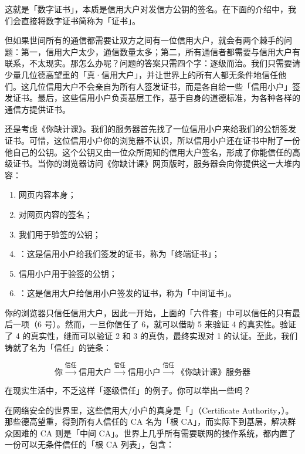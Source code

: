 这就是「数字证书」，本质是信用大户对发信方公钥的签名。在下面的介绍中，我们会直接将数字证书简称为「证书」。

但如果世间所有的通信都需要让双方之间有一位信用大户，就会有两个棘手的问题：第一，信用大户太少，通信数量太多；第二，所有通信者都需要与信用大户有联系，不太现实。那怎么办呢？问题的答案只需四个字：逐级而治。我们只需要请少量几位德高望重的「真·信用大户」，并让世界上的所有人都无条件地信任他们。这几位信用大户不会亲自为所有人签发证书，而是各自给一些「信用小户」签发证书。最后，这些信用小户负责基层工作，基于自身的道德标准，为各种各样的通信方提供证书。

还是考虑《你缺计课》。我们的服务器首先找了一位信用小户来给我们的公钥签发证书。可惜，这位信用小户你的浏览器不认识，所以信用小户还在证书中附了一份他自己的公钥。这个公钥又由一位众所周知的信用大户签名，形成了你能信任的高级证书。当你的浏览器访问《你缺计课》网页版时，服务器会向你提供这一大堆内容：

\begin{enumerate}
  \item 网页内容本身；
  \item 对网页内容的签名；
  \item 我们用于验签的公钥；
  \item {}：这是信用小户给我们签发的证书，称为「终端证书」；
  \item 信用小户用于验签的公钥；
  \item {}：这是信用大户给信用小户签发的证书，称为「中间证书」。
\end{enumerate}

你的浏览器只信任信用大户，因此一开始，上面的「六件套」中可以信任的只有最后一项（6 号）。然而，一旦你信任了 6，就可以借助 5 来验证 4 的真实性。验证了 4 的真实性，继而可以验证 2 和 3 的真伪，最终实现对 1 的认证。至此，我们铸就了名为「信任」的链条：

\[ \text{你}\xrightarrow{\text{信任}}\text{信用大户}\xrightarrow{\text{信任}}\text{信用小户}\xrightarrow{\text{信任}}\text{《你缺计课》服务器} \]

\begin{note}
  在现实生活中，不乏这样「逐级信任」的例子。你可以举出一些吗？
\end{note}

在网络安全的世界里，这些信用大/小户的真身是「」（Certificate Authority，）。那些德高望重，得到所有人信任的 CA 名为「根 CA」，而实际下到基层，解决群众困难的 CA 则是「中间 CA」。世界上几乎所有需要联网的操作系统，都内置了一份可以无条件信任的「根 CA 列表」，包含：


